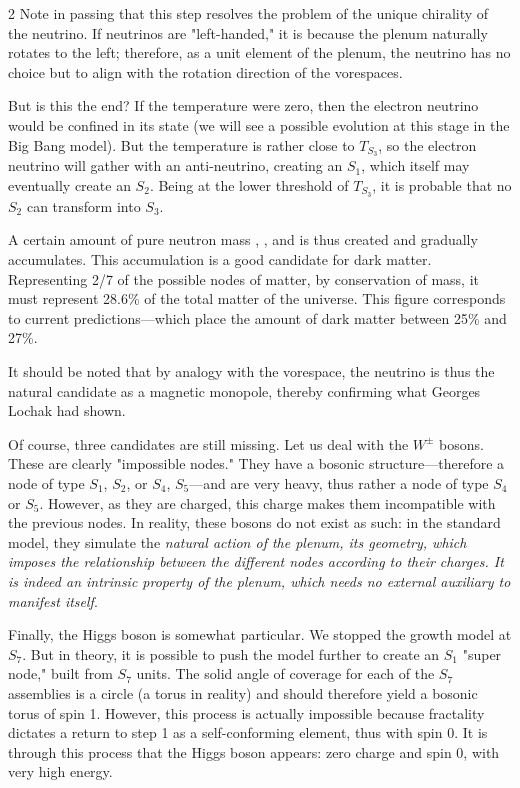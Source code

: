 \begin{multicols}{2}
	Note in passing that this step resolves the problem of the unique chirality of the neutrino. If neutrinos are "left-handed," it is because the plenum naturally rotates to the left; therefore, as a unit element of the plenum, the neutrino has no choice but to align with the rotation direction of the vorespaces.
	
	But is this the end? If the temperature were zero, then the electron neutrino would be confined in its state (we will see a possible evolution at this stage in the Big Bang model). But the temperature is rather close to $T_{S_3}$, so the electron neutrino will gather with an anti-neutrino, creating an $S_1$, which itself may eventually create an $S_2$. Being at the lower threshold of $T_{S_3}$, it is probable that no $S_2$ can transform into $S_3$.
	
	A certain amount of pure neutron mass , , and  is thus created and gradually accumulates. This accumulation is a good candidate for dark matter. Representing 2/7 of the possible nodes of matter, by conservation of mass, it must represent 28.6\% of the total matter of the universe. This figure corresponds to current predictions—which place the amount of dark matter between 25\% and 27\%.
	
	It should be noted that by analogy with the vorespace, the neutrino is thus the natural candidate as a magnetic monopole, thereby confirming what Georges Lochak had shown. \cite{lochak2002monopole}
	\medskip
	
	Of course, three candidates are still missing. Let us deal with the $W^{\pm}$ bosons. These are clearly "impossible nodes." They have a bosonic structure—therefore a node of type $S_1$, $S_2$, or $S_4$, $S_5$—and are very heavy, thus rather a node of type $S_4$ or $S_5$. However, as they are charged, this charge makes them incompatible with the previous nodes. In reality, these bosons do not exist as such: in the standard model, they simulate the \textit{natural action of the plenum, its geometry, which imposes the relationship between the different nodes according to their charges. It is indeed an intrinsic property of the plenum, which needs no external auxiliary to manifest itself}.
	
	Finally, the Higgs boson is somewhat particular. We stopped the growth model at $S_7$. But in theory, it is possible to push the model further to create an $S_1$ "super node," built from $S_7$ units. The solid angle of coverage for each of the $S_7$ assemblies is a circle (a torus in reality) and should therefore yield a bosonic torus of spin 1. However, this process is actually impossible because fractality dictates a return to step 1 as a self-conforming element, thus with spin 0. It is through this process that the Higgs boson appears: zero charge and spin 0, with very high energy.
	

\end{multicols}
